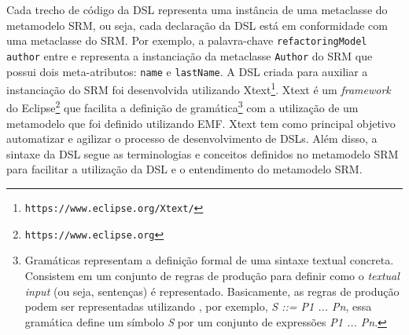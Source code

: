 Cada trecho de código da DSL representa uma instância de uma metaclasse do metamodelo SRM, ou seja, cada declaração da DSL está em conformidade com uma metaclasse do SRM. Por exemplo, a palavra-chave \texttt{refactoringModel} \texttt{author} entre \aspas{\{} e \aspas{\}} representa a instanciação da metaclasse \texttt{Author} do SRM que possui dois meta-atributos: \texttt{name} e \texttt{lastName}. A DSL criada para auxiliar a instanciação do SRM foi desenvolvida utilizando Xtext\footnote{\texttt{https://www.eclipse.org/Xtext/}}. Xtext é um \textit{framework} do Eclipse\footnote{\texttt{https://www.eclipse.org}} que facilita a definição de gramática\footnote{Gramáticas representam a definição formal de uma sintaxe textual concreta. Consistem em um conjunto de regras de produção para definir como o \textit{textual input} (ou seja, sentenças) é representado. Basicamente, as regras de produção podem ser representadas utilizando , por exemplo, \textit{S ::= P1 ... Pn}, essa gramática define um símbolo \textit{S} por um conjunto de expressões \textit{P1 ... Pn}.} 
com a utilização de um metamodelo que foi definido utilizando EMF. Xtext tem como principal objetivo automatizar e agilizar o processo de desenvolvimento de DSLs. Além disso, a sintaxe da DSL segue as terminologias e conceitos definidos no metamodelo SRM para facilitar a utilização da DSL e o entendimento do metamodelo SRM.





